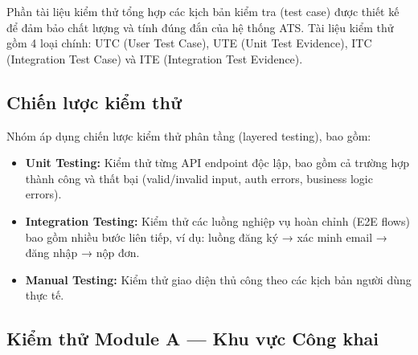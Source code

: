 Phần tài liệu kiểm thử tổng hợp các kịch bản kiểm tra (test case) được thiết kế để đảm bảo chất lượng và tính đúng đắn của hệ thống ATS. Tài liệu kiểm thử gồm 4 loại chính: UTC (User Test Case), UTE (Unit Test Evidence), ITC (Integration Test Case) và ITE (Integration Test Evidence).

\subsection{Chiến lược kiểm thử}
Nhóm áp dụng chiến lược kiểm thử phân tầng (layered testing), bao gồm:
\begin{itemize}
    \item \textbf{Unit Testing:} Kiểm thử từng API endpoint độc lập, bao gồm cả trường hợp thành công và thất bại (valid/invalid input, auth errors, business logic errors).
    \item \textbf{Integration Testing:} Kiểm thử các luồng nghiệp vụ hoàn chỉnh (E2E flows) bao gồm nhiều bước liên tiếp, ví dụ: luồng đăng ký → xác minh email → đăng nhập → nộp đơn.
    \item \textbf{Manual Testing:} Kiểm thử giao diện thủ công theo các kịch bản người dùng thực tế.
\end{itemize}

\subsection{Kiểm thử Module A — Khu vực Công khai}

